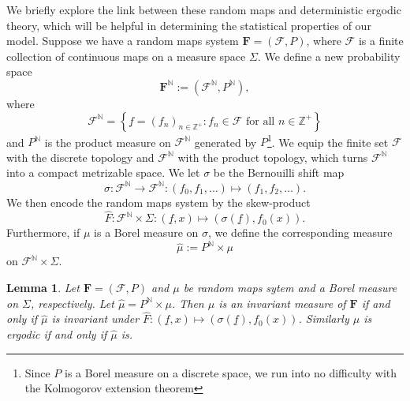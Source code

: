 \documentclass[pdftex,11pt,a4paper,oneside]{article}
\theoremstyle{plain}
\newtheorem{lemma}{Lemma}[section]
\begin{document}
We briefly explore the link between these random maps and deterministic ergodic theory, which will be helpful in determining the statistical properties of our model. Suppose we have a random maps system $\mathbf{F}=(\mathcal{F},P)$, where $\mathcal{F}$ is a finite collection of continuous maps on a measure space $\Sigma$. We define a new probability space 
\[\mathbf{F}^{\mathbb{N}}:=(\mathcal{F}^{\mathbb{N}},P^{\mathbb{N}}),\]
where 
\[\mathcal{F}^{\mathbb{N}} = \left\{\underline{f} = (f_n)_{n\in\mathbb{Z}^+}: f_n\in \mathcal{F} \text{ for all } n\in\mathbb{Z}^+\right\}\]
and $P^{\mathbb{N}}$ is the product measure on $\mathcal{F}^{\mathbb{N}}$ generated by $P$\footnote{Since $P$ is a Borel measure on a discrete space, we run into no difficulty with the Kolmogorov extension theorem}. We equip the finite set $\mathcal{F}$ with the discrete topology and $\mathcal{F}^{\mathbb{N}}$ with the product topology, which turns $\mathcal{F}^{\mathbb{N}}$ into a compact metrizable space. We let $\sigma$ be the Bernouilli shift map 
\[\sigma:\mathcal{F}^{\mathbb{N}}\to \mathcal{F}^{\mathbb{N}}: (f_0,f_1,\ldots) \mapsto (f_1,f_2,\ldots).\]
We then encode the random maps system by the skew-product 
\[\hat{F}:\mathcal{F}^{\mathbb{N}}\times \Sigma: (\underline{f} , x) \mapsto (\sigma(\underline{f}) , f_0 (x)).\]
Furthermore, if $\mu$ is a Borel measure on $\sigma$, we define the corresponding measure 
\[\hat{\mu}:=P^{\mathbb{N}}\times\mu\]
on $\mathcal{F}^{\mathbb{N}}\times \Sigma$.
\begin{lemma}\label{lemma:ConversionToDeterminism}
    Let $\mathbf{F}=(\mathcal{F},P)$ and $\mu$ be random maps sytem and a Borel measure on $\Sigma$, respectively. Let $ \hat{\mu}=P^{\mathbb{N}}\times\mu$. Then $\mu$ is an invariant measure of $\mathbf{F}$ if and only if $\hat{\mu}$ is invariant under $\hat{F}:(\underline{f} , x) \mapsto (\sigma(\underline{f}) , f_0 (x))$. Similarly $\mu$ is ergodic if and only if $\hat{\mu}$ is.
\end{lemma}
\end{document}
